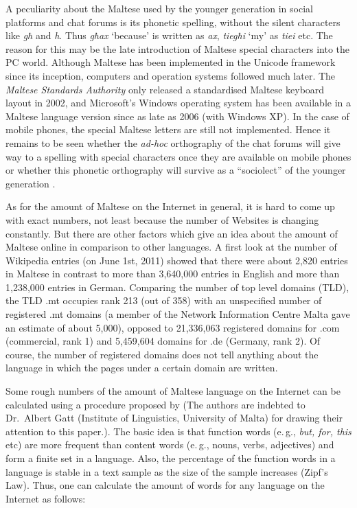 \begin{multicols}{2}
A peculiarity about the Maltese used by the younger generation in social platforms and chat forums is its phonetic spelling, without the silent characters like \emph{għ} and \emph{h}. Thus \emph{għax} `because' is written as \emph{ax}, \emph{tiegħi} `my' as \emph{tiei} etc. The reason for this may be the late introduction of Maltese special characters into the PC world. Although Maltese has been implemented in the Unicode framework since its inception, computers and operation systems followed much later. The \emph{Maltese Standards Authority} only released a standardised Maltese keyboard layout in 2002, and Microsoft's Windows operating system has been available in a Maltese language version since as late as 2006 (with Windows XP). In the case of mobile phones, the special Maltese letters are still not implemented. Hence it remains to be seen whether the \emph{ad-hoc} orthography of the chat forums will give way to a spelling with special characters once they are available on mobile phones or whether this phonetic orthography will survive as a ``sociolect'' of the younger generation \cite{Fabri:2011b}.

As for the amount of Maltese on the Internet in general, it is hard to come up with exact numbers, not least because the number of Websites is changing constantly. But there are other factors which give an idea about the amount of Maltese online in comparison to other languages.
A first look at the number of Wikipedia entries (on June 1st, 2011) showed that there were about 2,820 entries in Maltese in contrast to more than 3,640,000 entries in English and more than 1,238,000 entries in German.
Comparing the number of top level domains (TLD), the TLD .mt occupies rank 213 (out of 358) with an unspecified number of registered .mt domains (a member of the Network Information Centre Malta gave an estimate of about 5,000), opposed to 21,336,063 registered domains for .com (commercial, rank 1) and 5,459,604 domains for .de (Germany, rank 2). Of course, the number of registered domains does not tell anything about the language in which the pages under a certain domain are written.

Some rough numbers of the amount of Maltese language on the Internet can be calculated using a procedure proposed by \cite{Kilgarriff-Grefenstette:2003} (The authors are indebted to Dr.~Albert Gatt (Institute of Linguistics, University of Malta) for drawing their attention to this paper.). The basic idea is that function words (e.\,g., \emph{but, for, this} etc) are more frequent than content words (e.\,g., nouns, verbs, adjectives) and form a finite set in a language. Also, the percentage of the function words in a language is stable in a text sample as the size of the sample increases (Zipf's Law). Thus, one can calculate the amount of words for any language on the Internet as follows: 


\end{multicols}
